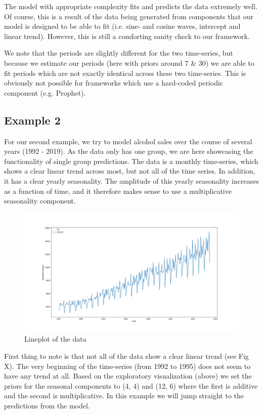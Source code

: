 \documentclass{article}
\begin{document}
The model with appropriate complexity fits and predicts the data extremely well. Of course, this is a result of the data being generated from components that our model is designed to be able to fit (i.e. sine- and cosine waves, intercept and linear trend). However, this is still a comforting sanity check to our framework.

We note that the periods are slightly different for the two time-series, but because we estimate our periods (here with priors around 7 \& 30) we are able to fit periods which are not exactly identical across these two time-series. This is obviously not possible for frameworks which use a hard-coded periodic component (e.g. Prophet). 

\subsection{Example 2}

For our second example, we try to model alcohol sales over the course of several years (1992 - 2019). As the data only has one group, we are here showcasing the functionality of single group predictions. The data is a monthly time-series, which shows a clear linear trend across most, but not all of the time series. In addition, it has a clear yearly seasonality. The amplitude of this yearly seasonality increases as a function of time, and it therefore makes sense to use a multiplicative seasonality component.

\begin{figure}[H]
    \centerline{\includegraphics[scale = 0.45]{../plots/ex2_plot_data.png}}
    \caption{Lineplot of the data}
\end{figure}

First thing to note is that not all of the data show a clear linear trend (see Fig X). The very beginning of the time-series (from 1992 to 1995) does not seem to have any trend at all. Based on the exploratory visualization (above) we set the priors for the seasonal components to (4, 4) and (12, 6) where the first is additive and the second is multiplicative. In this example we will jump straight to the predictions from the model. 
\end{document}
